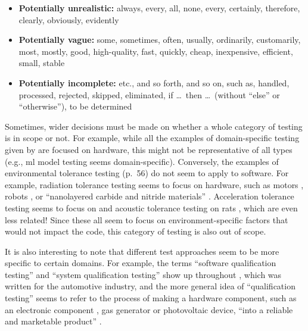       \begin{itemize}
            \item \textbf{Potentially unrealistic:} always, every, all, none, every,
                  certainly, therefore, clearly, obviously, evidently
            \item \textbf{Potentially vague:} some, sometimes, often, usually,
                  ordinarily, customarily, most, mostly, good, high-quality, fast,
                  quickly, cheap, inexpensive, efficient, small, stable
            \item \textbf{Potentially incomplete:} etc., and so forth, and so on,
                  such as, handled, processed, rejected, skipped, eliminated,
                  if \dots\ then \dots\ (without ``else'' or ``otherwise''),
                  to be determined \citep[p.~408]{vanVliet2000}
      \end{itemize}

      Sometimes, wider decisions must be made on whether a whole category of
      testing is in scope or not. For example, while all the examples of domain-specific
      testing given by \citet[p.~26]{Firesmith2015} are focused on hardware, this
      might not be representative of all types (e.g., \acf{ml} model testing seems
      domain-specific). Conversely, the examples of environmental tolerance testing
      (p.~56) do not seem to apply to software. For example, radiation tolerance
      testing seems to focus on hardware, such as motors \citep{MukhinEtAl2022},
      robots \citep{ZhangEtAl2020}, or ``nanolayered carbide and nitride materials''
      \citep[p.~1]{TunesEtAl2022}. Acceleration tolerance testing seems to focus on
      \accelTolTest{} and acoustic tolerance testing on rats \citep{HolleyEtAl1996},
      which are even less related! Since these all seem to focus on
      environment-specific factors that would not impact the code, this category of
      testing is also out of scope.

      It is also interesting to note that different test approaches seem to be more
      specific to certain domains. For example, the terms ``software qualification
      testing'' and ``system qualification testing'' show up throughout
      \citep{SPICE2022}, which was written for the automotive industry, and the more
      general idea of ``qualification testing'' seems to refer to the process of
      making a hardware component, such as an electronic component
      \citep{AhsanEtAl2020}, gas generator \citep{ParateEtAl2021} or photovoltaic
      device, ``into a reliable and marketable product'' \citep[p.~1]{SuhirEtAl2013}.
\fi

